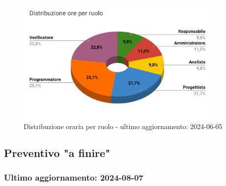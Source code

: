 \begin{figure}[H]
  \centering
  \includegraphics[width=0.90\textwidth]{assets/Preventivo/Totale/distribuzione_ore_ruolo.pdf}
  \caption{Distribuzione oraria per ruolo - ultimo aggiornamento: 2024-06-05}
\end{figure}

\subsection{Preventivo "a finire"}\label{sec:preventivo-a-finire}
\subsubsection{Ultimo aggiornamento: 2024-08-07}

